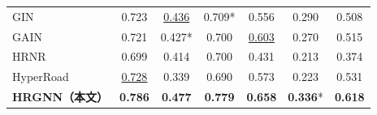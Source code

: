 \begin{table}[H]
\begin{tabular}{@{}lcccccc@{}}
GIN      & 0.723             & \underline{0.436} & 0.709*            & 0.556             & 0.290             & 0.508 \\
GAIN     & 0.721             & 0.427*            & 0.700             & \underline{0.603} & 0.270             & 0.515 \\
HRNR     & 0.699             & 0.414             & 0.700             & 0.431             & 0.213             & 0.374 \\
HyperRoad & \underline{0.728} & 0.339            & 0.690             & 0.573             & 0.223             & 0.531 \\
\midrule
\textbf{HRGNN（本文）} & \textbf{0.786} & \textbf{0.477} & \textbf{0.779} & \textbf{0.658} & \textbf{0.336}* & \textbf{0.618} \\
\bottomrule
\end{tabular}
\end{table}


